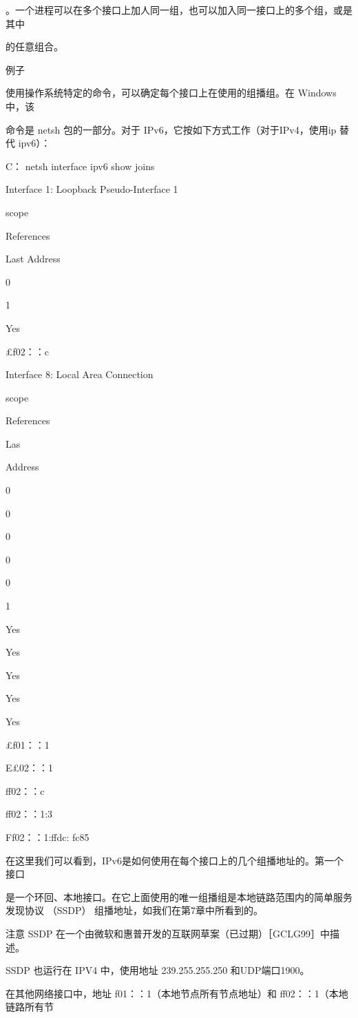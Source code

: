 。一个进程可以在多个接口上加人同一组，也可以加入同一接口上的多个组，或是其中

的任意组合。

例子

使用操作系统特定的命令，可以确定每个接口上在使用的组播组。在 Windows 中，该

命令是 netsh 包的一部分。对于 IPv6，它按如下方式工作（对于IPv4，使用ip 替代 ipv6）：

C：\> netsh interface ipv6 show joins

Interface 1: Loopback Pseudo-Interface 1

scope

References

Last Address

0

1

Yes

£f02：：c

Interface 8: Local Area Connection

scope

References

Las

Address

0

0

0

0

0

1

Yes

Yes

Yes

Yes

Yes

£f01：：1

E£02：：1

ff02：：c

ff02：：1:3

Ff02：：1:ffdc: fc85

在这里我们可以看到，IPv6是如何使用在每个接口上的几个组播地址的。第一个接口

是一个环回、本地接口。在它上面使用的唯一组播组是本地链路范围内的简单服务发现协议
（SSDP） 组播地址，如我们在第7章中所看到的。

注意 SSDP 在一个由微软和惠普开发的互联网草案（已过期）［GCLG99］中描述。

SSDP 也运行在 IPV4 中，使用地址 239.255.255.250 和UDP端口1900。

在其他网络接口中，地址 f01：：1（本地节点所有节点地址）和 ff02：：1（本地链路所有节

